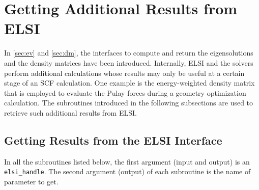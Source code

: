 \documentclass{report}
\begin{document}
\section{Getting Additional Results from ELSI}
\label{sec:getter}
In \ref{sec:ev} and \ref{sec:dm}, the interfaces to compute and return the eigensolutions and the density matrices have been introduced.  Internally, ELSI and the solvers perform additional calculations whose results may only be useful at a certain stage of an SCF calculation.  One example is the energy-weighted density matrix that is employed to evaluate the Pulay forces during a geometry optimization calculation.  The subroutines introduced in the following subsections are used to retrieve such additional results from ELSI.

\subsection{Getting Results from the ELSI Interface}
\label{subsec:getter_elsi}
In all the subroutines listed below, the first argument (input and output) is an \texttt{elsi\_handle}.  The second argument (output) of each subroutine is the name of parameter to get.
\end{document}
